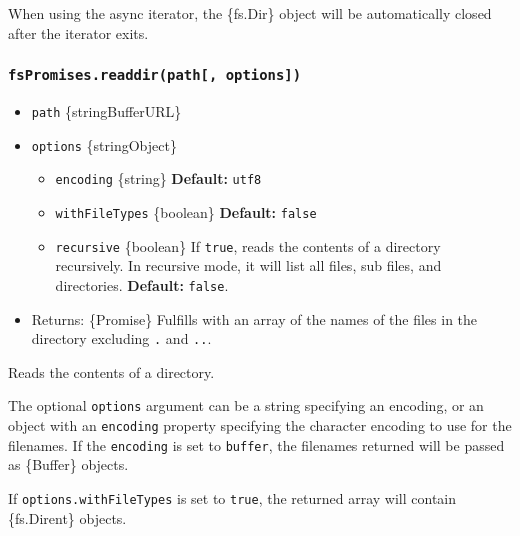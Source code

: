 When using the async iterator, the \{fs.Dir\} object will be
automatically closed after the iterator exits.

\subsubsection{\texorpdfstring{\texttt{fsPromises.readdir(path{[},\ options{]})}}{fsPromises.readdir(path{[}, options{]})}}\label{fspromises.readdirpath-options}

\begin{itemize}
\tightlist
\item
  \texttt{path} \{string\textbar Buffer\textbar URL\}
\item
  \texttt{options} \{string\textbar Object\}

  \begin{itemize}
  \tightlist
  \item
    \texttt{encoding} \{string\} \textbf{Default:}
    \texttt{\textquotesingle{}utf8\textquotesingle{}}
  \item
    \texttt{withFileTypes} \{boolean\} \textbf{Default:} \texttt{false}
  \item
    \texttt{recursive} \{boolean\} If \texttt{true}, reads the contents
    of a directory recursively. In recursive mode, it will list all
    files, sub files, and directories. \textbf{Default:} \texttt{false}.
  \end{itemize}
\item
  Returns: \{Promise\} Fulfills with an array of the names of the files
  in the directory excluding
  \texttt{\textquotesingle{}.\textquotesingle{}} and
  \texttt{\textquotesingle{}..\textquotesingle{}}.
\end{itemize}

Reads the contents of a directory.

The optional \texttt{options} argument can be a string specifying an
encoding, or an object with an \texttt{encoding} property specifying the
character encoding to use for the filenames. If the \texttt{encoding} is
set to \texttt{\textquotesingle{}buffer\textquotesingle{}}, the
filenames returned will be passed as \{Buffer\} objects.

If \texttt{options.withFileTypes} is set to \texttt{true}, the returned
array will contain \{fs.Dirent\} objects.

